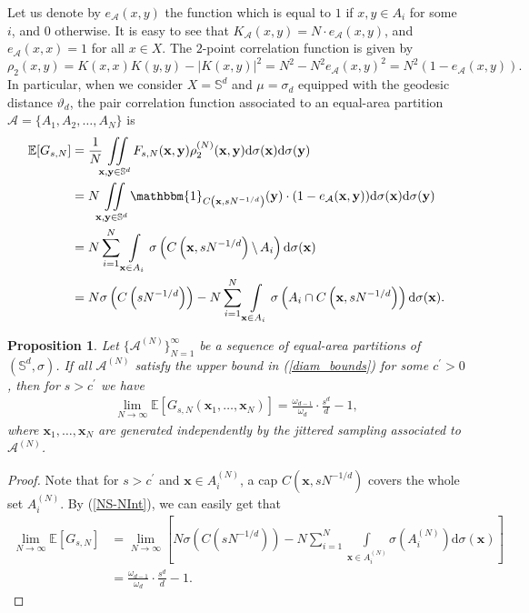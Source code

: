 \documentclass[a4paper,11pt]{amsart}
\newtheorem{prop}{Proposition}
\begin{document}
Let us denote by $e_\mathcal{A}(x,y)$ the function which is equal to $1$ if $x,y\in A_i$ for some $i$, and $0$ otherwise. It is easy to see that $K_\mathcal{A}(x,y)=N\cdot e_\mathcal{A}(x,y)$, and $e_\mathcal{A}(x,x)=1$ for all $x\in X$. The $2$-point correlation function is given by
$$\rho_2(x,y)=K(x,x)K(y,y)-|K(x,y)|^2=N^2-N^2e_\mathcal{A}(x,y)^2=N^2(1-e_\mathcal{A}(x,y)).$$
In particular, when we consider $X=\mathbb{S}^d$ and $\mu=\sigma_d$ equipped with the geodesic distance $\vartheta_d$, the pair correlation function associated to an equal-area partition $\mathcal{A}=\{A_1,A_2,\dots,A_N\}$ is
\begin{align}
    \mathbb{E}[G_{s,N}]&=\frac{1}{N}\iint\limits_{\mathbf{x},\mathbf{y}\in \mathbb{S}^d}F_{s,N}(\mathbf{x},\mathbf{y})\rho_2^{(N)}(\mathbf{x},\mathbf{y})\mathrm{d}\sigma(\mathbf{x})\mathrm{d}\sigma(\mathbf{y}) \nonumber
    \\ &=N \iint\limits_{\mathbf{x},\mathbf{y}\in \mathbb{S}^d}  \mathbbm{1}_{C\left(\mathbf{x},sN^{-1/d}\right)}(\mathbf{y})\cdot (1-e_\mathcal{A}(\mathbf{x},\mathbf{y}))\mathrm{d}\sigma(\mathbf{x})\mathrm{d} \sigma(\mathbf{y}) \nonumber
    \\ &=N \sum\limits_{i=1}^N\int\limits_{\mathbf{x}\in A_i}\sigma\left( C\left(\mathbf{x},sN^{-1/d}\right)\backslash\, A_i\right)\mathrm{d}\sigma(\mathbf{x}) \label{The integral}
    \\ &=N\sigma\left( C\left(sN^{-1/d}\right)\right)-N\sum\limits_{i=1}^N\int\limits_{\mathbf{x}\in A_i}\sigma\left(A_i\cap C\left(\mathbf{x},sN^{-1/d}\right)\right)\mathrm{d}\sigma(\mathbf{x}). \label{NS-NInt}
\end{align}

\begin{prop}\label{jittered large scale proposition}
    Let $\{\mathcal{A}^{(N)}\}_{N=1}^\infty$ be a sequence of equal-area partitions of $(\mathbb{S}^d,\sigma)$. If all $\mathcal{A}^{(N)}$ satisfy the upper bound in (\ref{diam_bounds}) for some $c^\prime>0$, then for $s>c^\prime$ we have
\begin{align*}
    \lim\limits_{N\rightarrow\infty}\mathbb{E}[G_{s,N}(\mathbf{x}_1,\dots,\mathbf{x}_N)]=\frac{\omega_{d-1}}{\omega_d}\cdot\frac{s^d}{d}-1,
\end{align*}
where $\mathbf{x}_1,\dots,\mathbf{x}_N$ are generated independently by the jittered sampling associated to $\mathcal{A}^{(N)}$.
\end{prop}
\begin{proof}
    Note that for $s>c^\prime$ and $\mathbf{x}\in A_i^{(N)}$, a cap $C(\mathbf{x},sN^{-1/d})$ covers the whole set $A_i^{(N)}$. By (\ref{NS-NInt}), we can easily get that
\begin{align*}
    \lim\limits_{N\rightarrow\infty}\mathbb{E}[G_{s,N}]&=\lim\limits_{N\rightarrow\infty}\left[N\sigma\left( C\left(sN^{-1/d}\right)\right)-N\sum\limits_{i=1}^N\int\limits_{\mathbf{x}\in A_i^{(N)}}\sigma\left(A_i^{(N)}\right)\mathrm{d}\sigma(\mathbf{x})\right]\\
    &=\frac{\omega_{d-1}}{\omega_d}\cdot\frac{s^d}{d}-1.
\end{align*}
\end{proof}
\end{document}
